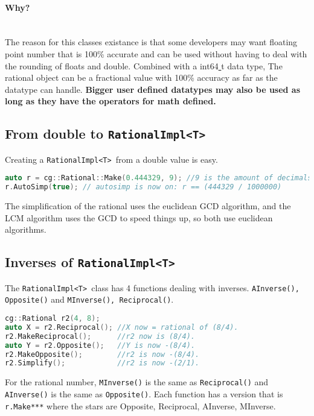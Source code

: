 \documentclass{article}
\newcommand{\theobj}{\protect\Verb+RationalImpl<T> +}
\begin{document}
\paragraph{Why?} \hfill \\
The reason for this classes existance is that some developers may want floating point number that is 100\% accurate and can be used without having to deal with the rounding of floats and double. Combined with a int64\underline{ }t data type, The rational object can be a fractional value with 100\% accuracy as far as the datatype can handle. \textbf{Bigger user defined datatypes may also be used as long as they have the operators for math defined.}

\subsection{From double to \theobj}

Creating a \theobj from a double value is easy.

\begin{lstlisting}[language=C++, label=code:1, caption=Creating organized rationals with \theobj]
auto r = cg::Rational::Make(0.444329, 9); //9 is the amount of decimals to keep. r == (444329000 / 1000000000)
r.AutoSimp(true); // autosimp is now on: r == (444329 / 1000000)
\end{lstlisting}

The simplification of the rational uses the euclidean GCD algorithm, and the LCM algorithm uses the GCD to speed things up, so both use euclidean algorithms.

\subsection{Inverses of \theobj}

The \theobj class has 4 functions dealing with inverses. \Verb+AInverse(), Opposite()+ and \Verb+MInverse(), Reciprocal()+.


\begin{lstlisting}[language=C++, label=code:1, caption=Creating organized rationals with \theobj]
cg::Rational r2(4, 8);
auto X = r2.Reciprocal(); //X now = rational of (8/4).
r2.MakeReciprocal();      //r2 now is (8/4).
auto Y = r2.Opposite();   //Y is now -(8/4).
r2.MakeOpposite();        //r2 is now -(8/4).
r2.Simplify();            //r2 is now -(2/1).
\end{lstlisting}

For the rational number, \Verb+MInverse()+ is the same as \Verb+Reciprocal()+ and \Verb+AInverse()+ is the same as \Verb+Opposite()+. Each function has a version that is \Verb+r.Make***+ where the stars are Opposite, Reciprocal, AInverse, MInverse.
\end{document}
